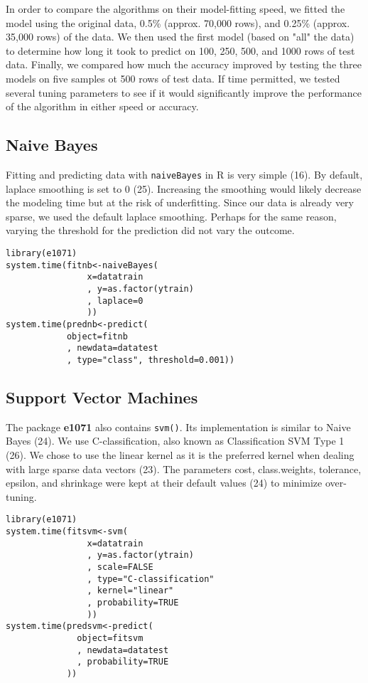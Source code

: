 \documentclass[a4paper]{article}
\begin{document}
\begin{multicols}{2}
In order to compare the algorithms on their model-fitting speed, we fitted the model using the original data, 0.5\% (approx. 70,000 rows), and 0.25\% (approx. 35,000 rows) of the data. We then used the first model (based on "all" the data) to determine how long it took to predict on 100, 250, 500, and 1000 rows of test data. Finally, we compared how much the accuracy improved by testing the three models on five samples ot 500 rows of test data. If time permitted, we tested several tuning parameters to see if it would significantly improve the performance of the algorithm in either speed or accuracy.

\subsection*{Naive Bayes}
Fitting and predicting data with \texttt{naiveBayes} in R is very simple (16). By default, laplace smoothing is set to 0 (25). Increasing the smoothing would likely decrease the modeling time but at the risk of underfitting. Since our data is already very sparse, we used the default laplace smoothing. Perhaps for the same reason, varying the threshold for the prediction did not vary the outcome.
\begin{verbatim}
library(e1071)
system.time(fitnb<-naiveBayes(
                x=datatrain
                , y=as.factor(ytrain)
                , laplace=0
                ))
system.time(prednb<-predict(
            object=fitnb
            , newdata=datatest
            , type="class", threshold=0.001))
\end{verbatim}

\subsection*{Support Vector Machines}
The package \textbf{e1071} also contains \texttt{svm()}. Its implementation is similar to Naive Bayes (24). We use C-classification, also known as Classification SVM Type 1 (26). We chose to use the linear kernel as it is the preferred kernel when dealing with large sparse data vectors (23). The parameters cost, class.weights, tolerance, epsilon, and shrinkage were kept at their default values (24) to minimize over-tuning.
\begin{verbatim}
library(e1071)
system.time(fitsvm<-svm(
                x=datatrain
                , y=as.factor(ytrain)
                , scale=FALSE
                , type="C-classification"
                , kernel="linear"
                , probability=TRUE
                ))
system.time(predsvm<-predict(
              object=fitsvm
              , newdata=datatest
              , probability=TRUE
            ))
\end{verbatim}





\end{multicols}
\end{document}
